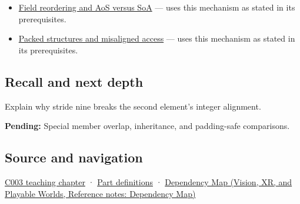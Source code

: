 \begin{itemize}
\tightlist
\item
  \hyperref[appendix-5522ad176ca0]{Field reordering and AoS versus SoA} --- uses this mechanism as stated in its prerequisites.
\item
  \hyperref[appendix-0682dbfc5f0e]{Packed structures and misaligned access} --- uses this mechanism as stated in its prerequisites.
\end{itemize}

\subsection{Recall and next depth}\label{appendix-f52f8c5a3afd-recall-and-next-depth}

\hypertarget{appendix-f52f8c5a3afd-recall-and-next-depth}{}

Explain why stride nine breaks the second element's integer alignment.

\textbf{Pending:} Special member overlap, inheritance, and padding-safe comparisons.

\subsection{Source and navigation}\label{appendix-f52f8c5a3afd-source-and-navigation}

\hypertarget{appendix-f52f8c5a3afd-source-and-navigation}{}

\hyperref[01-foundations-i-ch002-where-the-bytes-live]{C003 teaching chapter} · \hyperref[appendix-fd090d982a15-m003---parts-41-60]{Part definitions} · \href{../07-Vision-XR-and-Playable-Worlds/main.pdf\#nameddest=appendix-4ad47bdd269a}{Dependency Map (Vision, XR, and Playable Worlds, Reference notes: Dependency Map)}
